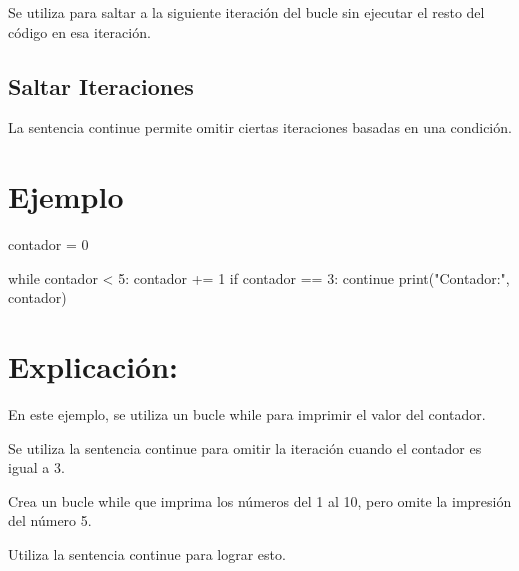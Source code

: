 \documentclass[
  a4paper,
  onepage,
  openany]{scrreprt}
\newenvironment{Shaded}{\begin{snugshade}}{\end{snugshade}}
\newcommand{\BuiltInTok}[1]{\textcolor[rgb]{0.00,0.23,0.31}{#1}}
\newcommand{\ControlFlowTok}[1]{\textcolor[rgb]{0.00,0.23,0.31}{#1}}
\newcommand{\DecValTok}[1]{\textcolor[rgb]{0.68,0.00,0.00}{#1}}
\newcommand{\NormalTok}[1]{\textcolor[rgb]{0.00,0.23,0.31}{#1}}
\newcommand{\OperatorTok}[1]{\textcolor[rgb]{0.37,0.37,0.37}{#1}}
\newcommand{\StringTok}[1]{\textcolor[rgb]{0.13,0.47,0.30}{#1}}
\begin{document}
Se utiliza para saltar a la siguiente iteración del bucle sin ejecutar
el resto del código en esa iteración.

\hypertarget{saltar-iteraciones}{%
\subsection{Saltar Iteraciones}\label{saltar-iteraciones}}

La sentencia continue permite omitir ciertas iteraciones basadas en una
condición.

\hypertarget{ejemplo-40}{%
\section{Ejemplo}\label{ejemplo-40}}

\begin{Shaded}
\begin{Highlighting}[]
\NormalTok{contador }\OperatorTok{=} \DecValTok{0}

\ControlFlowTok{while}\NormalTok{ contador }\OperatorTok{\textless{}} \DecValTok{5}\NormalTok{:}
\NormalTok{    contador }\OperatorTok{+=} \DecValTok{1}
    \ControlFlowTok{if}\NormalTok{ contador }\OperatorTok{==} \DecValTok{3}\NormalTok{:}
        \ControlFlowTok{continue}
    \BuiltInTok{print}\NormalTok{(}\StringTok{"Contador:"}\NormalTok{, contador)}
\end{Highlighting}
\end{Shaded}

\hypertarget{explicaciuxf3n-40}{%
\section{Explicación:}\label{explicaciuxf3n-40}}

En este ejemplo, se utiliza un bucle while para imprimir el valor del
contador.

Se utiliza la sentencia continue para omitir la iteración cuando el
contador es igual a 3.

\begin{tcolorbox}[enhanced jigsaw, breakable, opacityback=0, toptitle=1mm, coltitle=black, toprule=.15mm, rightrule=.15mm, colframe=quarto-callout-important-color-frame, opacitybacktitle=0.6, arc=.35mm, title=\textcolor{quarto-callout-important-color}{\faExclamation}\hspace{0.5em}{Actividad Práctica:}, titlerule=0mm, colbacktitle=quarto-callout-important-color!10!white, bottomtitle=1mm, bottomrule=.15mm, colback=white, left=2mm, leftrule=.75mm]

Crea un bucle while que imprima los números del 1 al 10, pero omite la
impresión del número 5.

Utiliza la sentencia continue para lograr esto.

\end{tcolorbox}
\end{document}
